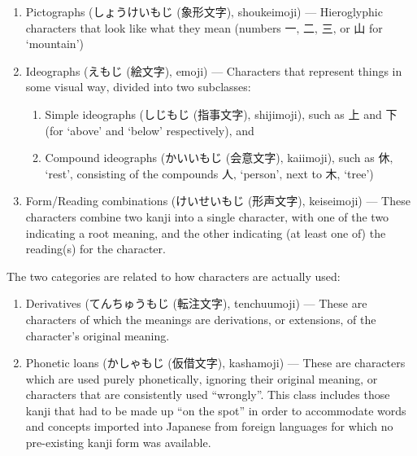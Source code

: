 \documentclass[11pt, b5paper, twoside, openright, onecolumn]{book}
\makeatletter
\newcommand*{\rubystack}[2]{{\relscale{0.5}%
  \begin{tabular}[b]{@{}c@{}}%
    {#1}\\%
   {\textscale{2}{#2}}%
  \end{tabular}}%
}
\DeclareRobustCommand*{\ruby}[2]{%
  \mbox{%
    \setlength{\parskip}{0ex}%
    \BeginAccSupp{method=pdfstringdef,ActualText={#1}}%
      \rubystack{\phantom{#2}}{#1}%
      \llap{%
        \rubystack{#2}{\phantom{#1}}%
      }%
    \EndAccSupp{}%
  }%
}
\renewcommand*{\ruby}[2]{#2 (#1)}%
\makeatother
\begin{document}
\begin{enumerate}
\item {}Pictographs (\ruby{象形文字}{しょうけいもじ}‚ shoukeimoji) — Hieroglyphic characters that look like what they mean (numbers 一‚ 二‚ 三‚ or 山 for ‘mountain’)
\item {}Ideographs (\ruby{絵文字}{えもじ}‚ emoji) — Characters that represent things in some visual way‚ divided into two subclasses:
\begin{enumerate}
\item Simple ideographs (\ruby{指事文字}{しじもじ}‚ shijimoji)‚ such as 上 and 下 (for ‘above’ and ‘below’ respectively)‚ and
\item Compound ideographs (\ruby{会意文字}{かいいもじ}‚ kaiimoji)‚ such as 休‚ ‘rest’‚ consisting of the compounds 人‚ ‘person’‚ next to 木‚ ‘tree’)
\end{enumerate}
\item {}Form/Reading combinations (\ruby{形声文字}{けいせいもじ}‚ keiseimoji) — These characters combine two kanji into a single character‚ with one of the two indicating a root meaning‚ and the other indicating (at least one of) the reading(s) for the character.
\end{enumerate}

The two categories are related to how characters are actually used:

\begin{enumerate}
\item {}Derivatives (\ruby{転注文字}{てんちゅうもじ}‚ tenchuumoji) — These are characters of which the meanings are derivations‚ or extensions‚ of the character’s original meaning.
\item {}Phonetic loans (\ruby{仮借文字}{かしゃもじ}‚ kashamoji) — These are characters which are used purely phonetically‚ ignoring their original meaning‚ or characters that are consistently used “wrongly”. This class includes those kanji that had to be made up “on the spot” in order to accommodate words and concepts imported into Japanese from foreign languages for which no pre-existing kanji form was available.
\end{enumerate}
\end{document}
